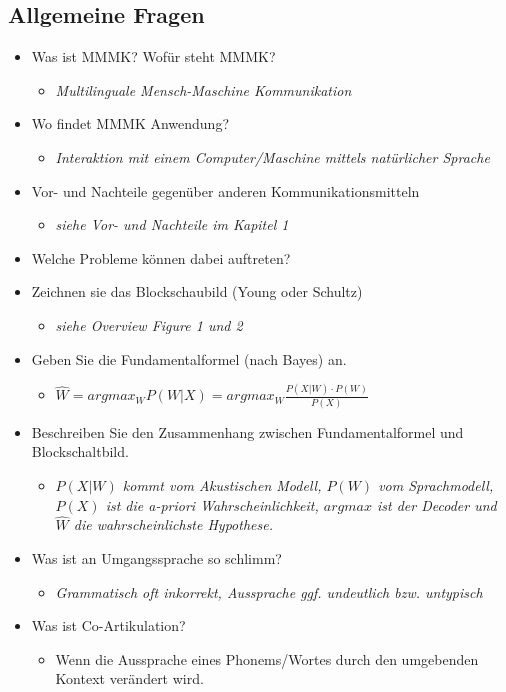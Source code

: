 \documentclass[11pt]{article}
\begin{document}
\subsection{Allgemeine Fragen}
\begin{itemize}
\item Was ist MMMK? Wofür steht MMMK?
\begin{itemize}
\item \emph{Multilinguale Mensch-Maschine Kommunikation}
\end{itemize}
\item Wo findet MMMK Anwendung?
\begin{itemize}
\item \emph{Interaktion mit einem Computer/Maschine  mittels natürlicher Sprache}
\end{itemize}
\item Vor- und Nachteile gegenüber anderen Kommunikationsmitteln
\begin{itemize}
\item \emph{siehe Vor- und Nachteile im Kapitel 1} %
\end{itemize}
\item Welche Probleme können dabei auftreten?
\item Zeichnen sie das Blockschaubild (Young oder Schultz)
\begin{itemize}
\item \emph{siehe Overview Figure 1 und 2} %
\end{itemize}
\item Geben Sie die Fundamentalformel (nach Bayes) an.
\begin{itemize}
\item $\hat{W} = argmax_{W} P(W | X) = argmax_{W} \frac{P(X|W) \cdot P(W)}{P(X)}$ 
\end{itemize}
\item Beschreiben Sie den Zusammenhang zwischen Fundamentalformel und Blockschaltbild.
\begin{itemize}
\item\emph{$P(X|W)$ kommt vom Akustischen Modell, $P(W)$ vom Sprachmodell, $P(X)$ ist die a-priori Wahrscheinlichkeit, 
$argmax$ ist der Decoder und $\hat{W}$ die wahrscheinlichste Hypothese.}
\end{itemize}
\item Was ist an Umgangssprache so schlimm?
\begin{itemize}
\item \emph{Grammatisch oft inkorrekt, Aussprache ggf. undeutlich bzw. untypisch}
\end{itemize}
\item Was ist Co-Artikulation?
\begin{itemize}
\item Wenn die Aussprache eines Phonems/Wortes durch den umgebenden Kontext verändert wird.
\end{itemize}
\end{itemize}
\end{document}

